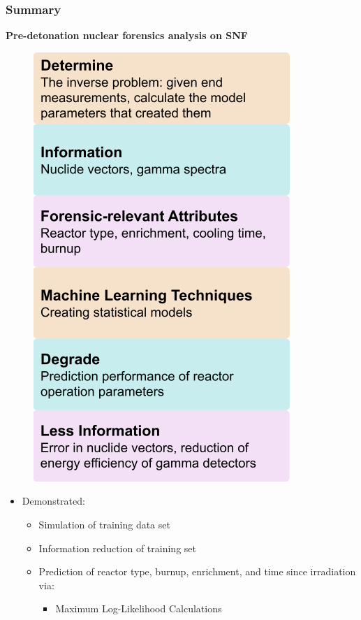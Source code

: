 \begin{frame}
  \frametitle{Summary}
  \textbf{Pre-detonation nuclear forensics analysis on SNF}
  \begin{minipage}{0.35\textwidth}
    \begin{figure}
      \centering
      \includegraphics[height=0.7\textheight]{./figures/overview.png}
    \end{figure}
  \end{minipage}%
  \begin{minipage}{0.65\textwidth}
  \begin{itemize}
    \item Demonstrated:
    \begin{itemize}
      \item Simulation of training data set
      \item Information reduction of training set
      \item Prediction of reactor type, burnup, enrichment, and time since irradiation via:
        \begin{itemize}
          \item Maximum Log-Likelihood Calculations

\end{itemize}
\end{itemize}
\end{itemize}
\end{minipage}
\end{frame}
